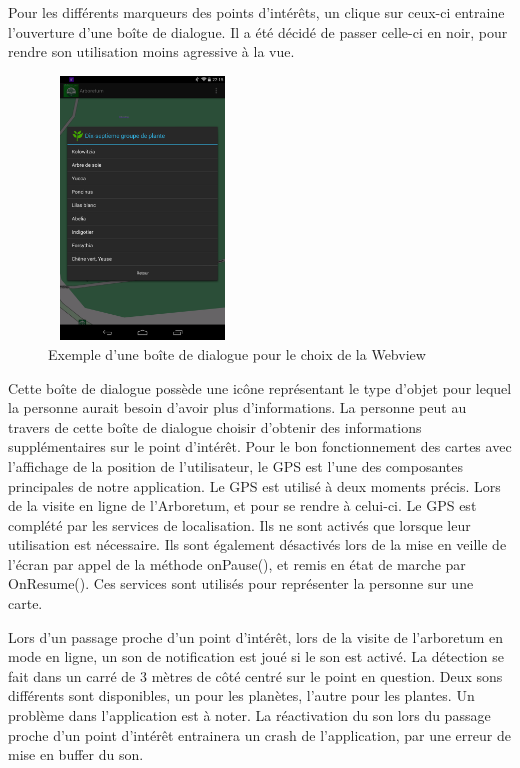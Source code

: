 \documentclass[a4paper,11pt]{article}
\begin{document}
			Pour les différents marqueurs des points d'intérêts, un clique sur ceux-ci entraine l'ouverture d'une boîte de dialogue. 
			Il a été décidé de passer celle-ci en noir, pour rendre son utilisation moins agressive à la vue. 
			
			\begin{figure}[H]
     \begin{center}
      \includegraphics[width=5cm,height=7cm]{menuchoix.png}
      \caption{Exemple d'une boîte de dialogue pour le choix de la Webview}
     \end{center}
    \end{figure}
			Cette boîte de dialogue possède une icône représentant le type d'objet pour lequel la personne aurait besoin d'avoir plus d'informations. La personne peut au travers de cette boîte de dialogue choisir d'obtenir des informations supplémentaires sur le point d'intérêt.
		Pour le bon fonctionnement des cartes avec l’affichage de la position de l'utilisateur, le GPS est l'une des composantes principales de notre application. Le GPS est utilisé à deux moments précis. Lors de la visite en ligne de l'Arboretum, et pour se rendre à celui-ci. Le GPS est complété par les services de localisation. Ils ne sont activés que lorsque leur utilisation est nécessaire. Ils sont également désactivés lors de la mise en veille de l'écran par appel de la méthode onPause(), et remis en état de marche par OnResume(). Ces services sont utilisés pour représenter la personne sur une carte.
		
		Lors d'un passage proche d'un point d'intérêt, lors de la visite de l'arboretum en mode en ligne, un son de notification est joué si le son est activé. La détection se fait dans un carré de 3 mètres de côté centré sur le point en question. Deux sons différents sont disponibles, un pour les planètes, l'autre pour les plantes. Un problème dans l'application est à noter. La réactivation du son lors du passage proche d'un point d'intérêt entrainera un crash de l'application, par une erreur de mise en buffer du son.
		
\end{document}
